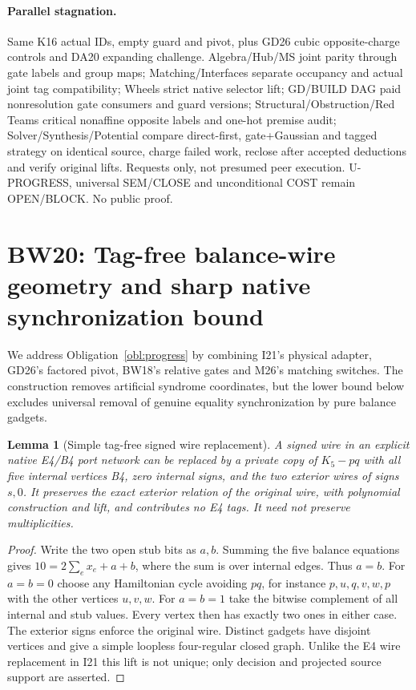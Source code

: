 \documentclass[11pt]{article}
\newtheorem{lemma}[theorem]{Lemma}
\begin{document}
\paragraph{Parallel stagnation.}
Same K16 actual IDs, empty guard and pivot, plus GD26 cubic opposite-charge controls and DA20 expanding challenge. Algebra/Hub/MS joint parity through gate labels and group maps; Matching/Interfaces separate occupancy and actual joint tag compatibility; Wheels strict native selector lift; GD/BUILD DAG paid nonresolution gate consumers and guard versions; Structural/Obstruction/Red Teams critical nonaffine opposite labels and one-hot premise audit; Solver/Synthesis/Potential compare direct-first, gate+Gaussian and tagged strategy on identical source, charge failed work, reclose after accepted deductions and verify original lifts. Requests only, not presumed peer execution. U-PROGRESS, universal SEM/CLOSE and unconditional COST remain OPEN/BLOCK. No public proof.


\section{BW20: Tag-free balance-wire geometry and sharp native synchronization bound}\label{sec:bw20}
We address Obligation~\ref{obl:progress} by combining I21's physical adapter, GD26's factored pivot, BW18's relative gates and M26's matching switches. The construction removes artificial syndrome coordinates, but the lower bound below excludes universal removal of genuine equality synchronization by pure balance gadgets.

\begin{lemma}[Simple tag-free signed wire replacement]\label{lem:bw20-wire}
A signed wire in an explicit native E4/B4 port network can be replaced by a private copy of $K_5-pq$ with all five internal vertices B4, zero internal signs, and the two exterior wires of signs $s,0$. It preserves the exact exterior relation of the original wire, with polynomial construction and lift, and contributes no E4 tags. It need not preserve multiplicities.
\end{lemma}
\begin{proof}
Write the two open stub bits as $a,b$. Summing the five balance equations gives $10=2\sum_e x_e+a+b$, where the sum is over internal edges. Thus $a=b$. For $a=b=0$ choose any Hamiltonian cycle avoiding $pq$, for instance $p,u,q,v,w,p$ with the other vertices $u,v,w$. For $a=b=1$ take the bitwise complement of all internal and stub values. Every vertex then has exactly two ones in either case. The exterior signs enforce the original wire. Distinct gadgets have disjoint vertices and give a simple loopless four-regular closed graph. Unlike the E4 wire replacement in I21 this lift is not unique; only decision and projected source support are asserted.
\end{proof}
\end{document}
